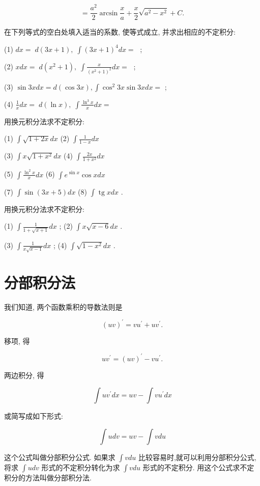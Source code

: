 \documentclass[lang=cn,newtx,10pt,scheme=chinese]{elegantbook}
\begin{document}
\[
= \frac{{a}^{2}}{2}\arcsin \frac{x}{a} + \frac{x}{2}\sqrt{{a}^{2} - {x}^{2}} + C.
\]

\begin{problemset}[练习]

\item 在下列等式的空白处填入适当的系数, 使等式成立, 并求出相应的不定积分:

(1) \({dx} = \;d\left( {{3x} + 1}\right) ,\;\int {\left( 3x + 1\right) }^{4}{dx} = \;\) ;

(2) \({xdx} = \;d\left( {{x}^{2} + 1}\right) ,\;\int \frac{x}{{\left( {x}^{2} + 1\right) }^{2}}{dx} = \;\) ;

(3) \(\sin {3xdx} = d\left( {\cos {3x}}\right) ,\int {\cos }^{2}{3x}\sin {3xdx} =\) ;

(4) \(\frac{1}{x}{dx} = \;d\left( {\ln x}\right) ,\;\int \frac{{\ln }^{3}x}{x}{dx} =\)

\item 用换元积分法求不定积分:

(1) \(\int \sqrt{1 + {2x}}{dx}\) (2) \(\int \frac{1}{1 - x}{dx}\)

(3) \(\int x\sqrt{1 + {x}^{2}}{dx}\) (4) \(\int \frac{2x}{1 + {x}^{2}}{dx}\)

(5) \(\int \frac{{\ln }^{2}x}{x}{dx}\) (6) \(\int {e}^{\sin x}\cos {xdx}\)

(7) \(\int \sin \left( {{3x} + 5}\right) {dx}\) (8) \(\int \operatorname{tg}{xdx}\) .

\item 用换元积分法求不定积分:

(1) \(\int \frac{1}{1 + \sqrt{x + 1}}{dx}\) ; (2) \(\int x\sqrt{x - 6}{dx}\) .

(3) \(\int \frac{1}{x\sqrt{x - 1}}{dx}\) ; (4) \(\int \sqrt{1 - {x}^{2}}{dx}\) .

\end{problemset}

\section{分部积分法}

\begin{proposition}[分部积分法]

我们知道, 两个函数乘积的导数法则是

\[
{\left( uv\right) }^{\prime } = v{u}^{\prime } + u{v}^{\prime }.
\]

移项, 得

\[
u{v}^{\prime } = {\left( uv\right) }^{\prime } - v{u}^{\prime }.
\]

两边积分, 得

\[
\int u{v}^{\prime }{dx} = {uv} - \int v{u}^{\prime }{dx}
\]

或简写成如下形式:

\[
\int {udv} = {uv} - \int {vdu}
\]

这个公式叫做分部积分公式. 如果求 \(\int {vdu}\) 比较容易时,就可以利用分部积分公式,将求 \(\int {udv}\) 形式的不定积分转化为求 \(\int {vdu}\) 形式的不定积分. 用这个公式求不定积分的方法叫做分部积分法.

\end{proposition}
\end{document}
